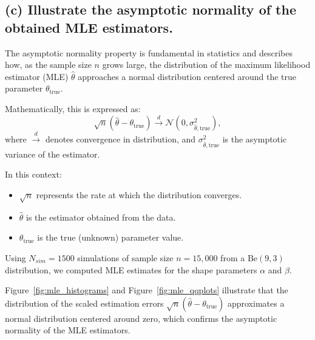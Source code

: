 

\subsection*{(c) Illustrate the asymptotic normality of the obtained MLE estimators.}

The asymptotic normality property is fundamental in statistics and describes how, as the sample size \(n\) grows large, the distribution of the maximum likelihood estimator (MLE) \(\hat{\theta}\) approaches a normal distribution centered around the true parameter \(\theta_{\text{true}}\).

Mathematically, this is expressed as:
\[
\sqrt{n}(\hat{\theta} - \theta_{\text{true}}) \xrightarrow{d} \mathcal{N}\left(0, \sigma^2_{\hat{\theta}, \text{true}}\right),
\]
where \(\xrightarrow{d}\) denotes convergence in distribution, and \(\sigma^2_{\hat{\theta}, \text{true}}\) is the asymptotic variance of the estimator.

In this context:
\begin{itemize}
    \item \(\sqrt{n}\) represents the rate at which the distribution converges.
    \item \(\hat{\theta}\) is the estimator obtained from the data.
    \item \(\theta_{\text{true}}\) is the true (unknown) parameter value.
\end{itemize}

\vspace{0.5em}
Using \(N_{sim} = 1500\) simulations of sample size \(n = 15,000\) from a \(\text{Be}(9, 3)\) distribution, we computed MLE estimates for the shape parameters \(\alpha\) and \(\beta\).

Figure~\ref{fig:mle_histograms} and Figure~\ref{fig:mle_qqplots} illustrate that the distribution of the scaled estimation errors \(\sqrt{n}(\hat{\theta} - \theta_{\text{true}})\) approximates a normal distribution centered around zero, which confirms the asymptotic normality of the MLE estimators.

